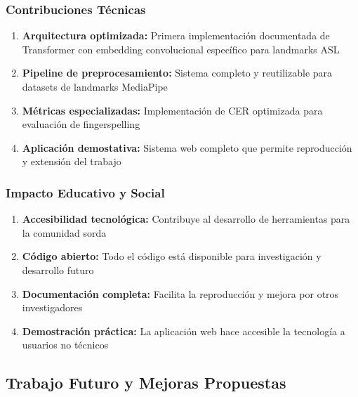 \documentclass[12pt,a4paper]{article}
\begin{document}
\subsubsection{Contribuciones Técnicas}
\begin{enumerate}
    \item \textbf{Arquitectura optimizada:} Primera implementación documentada de Transformer con embedding convolucional específico para landmarks ASL
    
    \item \textbf{Pipeline de preprocesamiento:} Sistema completo y reutilizable para datasets de landmarks MediaPipe
    
    \item \textbf{Métricas especializadas:} Implementación de CER optimizada para evaluación de fingerspelling
    
    \item \textbf{Aplicación demostativa:} Sistema web completo que permite reproducción y extensión del trabajo
\end{enumerate}

\subsubsection{Impacto Educativo y Social}
\begin{enumerate}
    \item \textbf{Accesibilidad tecnológica:} Contribuye al desarrollo de herramientas para la comunidad sorda
    
    \item \textbf{Código abierto:} Todo el código está disponible para investigación y desarrollo futuro
    
    \item \textbf{Documentación completa:} Facilita la reproducción y mejora por otros investigadores
    
    \item \textbf{Demostración práctica:} La aplicación web hace accesible la tecnología a usuarios no técnicos
\end{enumerate}

\subsection{Trabajo Futuro y Mejoras Propuestas}
\end{document}
